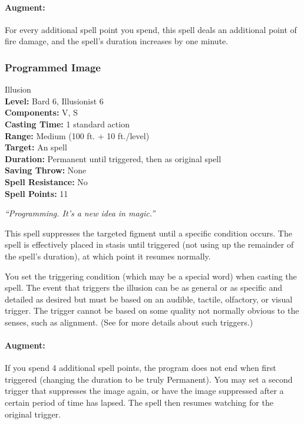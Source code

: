 \paragraph{Augment:} For every additional spell point you spend, this spell deals an additional point of fire damage, and the spell's duration increases by one minute.
\subsubsection{Programmed Image}
\label{Spell:ProgrammedImage}
Illusion
\\ \textbf{Level:} Bard 6, Illusionist 6
\\ \textbf{Components:} V, S
\\ \textbf{Casting Time:} 1 standard action
\\ \textbf{Range:} Medium (100 ft. + 10 ft./level)
\\ \textbf{Target:} An  spell
\\ \textbf{Duration:} Permanent until triggered, then as original spell
\\ \textbf{Saving Throw:} None
\\ \textbf{Spell Resistance:} No
\\ \textbf{Spell Points:} 11

\emph{``Programming. It's a new idea in magic.''}

This spell suppresses the targeted figment until a specific condition occurs. 
The spell is effectively placed in stasis until triggered (not using up the remainder of the spell's duration),
at which point it resumes normally.

You set the triggering condition (which may be a special word) when casting the spell. 
The event that triggers the illusion can be as general or as specific and detailed as desired but must be based on an audible, tactile, olfactory, or visual trigger. 
The trigger cannot be based on some quality not normally obvious to the senses, such as alignment. (See  for more details about such triggers.)

\paragraph{Augment:} If you spend 4 additional spell points, the program does not end when first triggered (changing the duration to be truly Permanent).
You may set a second trigger that suppresses the image again, or have the image suppressed after a certain period of time has lapsed.
The spell then resumes watching for the original trigger.
